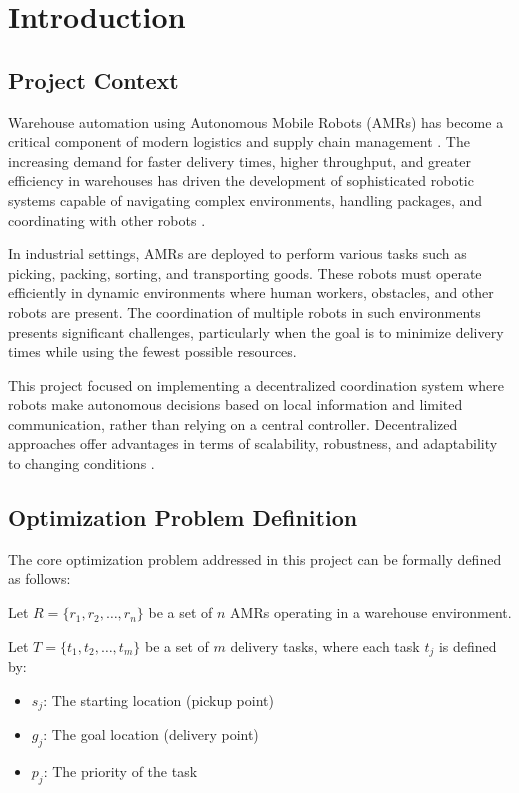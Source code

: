 \documentclass[12pt,a4paper]{article}
\begin{document}
\tableofcontents
\newpage


\section{Introduction}

\subsection{Project Context}
Warehouse automation using Autonomous Mobile Robots (AMRs) has become a critical component of modern logistics and supply chain management \cite{wurman2008coordinating}. The increasing demand for faster delivery times, higher throughput, and greater efficiency in warehouses has driven the development of sophisticated robotic systems capable of navigating complex environments, handling packages, and coordinating with other robots \cite{enright2011optimization}.

In industrial settings, AMRs are deployed to perform various tasks such as picking, packing, sorting, and transporting goods. These robots must operate efficiently in dynamic environments where human workers, obstacles, and other robots are present. The coordination of multiple robots in such environments presents significant challenges, particularly when the goal is to minimize delivery times while using the fewest possible resources.

This project focused on implementing a decentralized coordination system where robots make autonomous decisions based on local information and limited communication, rather than relying on a central controller. Decentralized approaches offer advantages in terms of scalability, robustness, and adaptability to changing conditions \cite{yan2013survey}.

\subsection{Optimization Problem Definition}
The core optimization problem addressed in this project can be formally defined as follows:

Let $R = \{r_1, r_2, \ldots, r_n\}$ be a set of $n$ AMRs operating in a warehouse environment.

Let $T = \{t_1, t_2, \ldots, t_m\}$ be a set of $m$ delivery tasks, where each task $t_j$ is defined by:
\begin{itemize}
    \item $s_j$: The starting location (pickup point)
    \item $g_j$: The goal location (delivery point)
    \item $p_j$: The priority of the task
\end{itemize}
\end{document}
